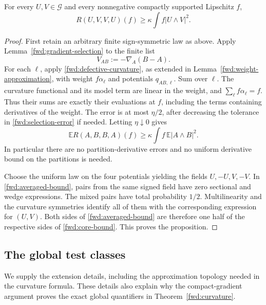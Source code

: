 \begin{proposition}
\label{fwd:gradient-bound}
For every \(U,V\in\mathcal G\) and every nonnegative compactly
supported Lipschitz \(f\),
\begin{equation}
\label{fwd:core-bound}
 R(U,V,V,U)(f)\geq\kappa\int f|U\wedge V|^2.
\end{equation}
\end{proposition}

\begin{proof}
First retain an arbitrary finite sign-symmetric law as above. Apply
Lemma~\ref{fwd:gradient-selection} to the finite list
\[
 V_{AB}:=-\nabla_A(B-A).
\]
For each \(\ell\), apply \eqref{fwd:defective-curvature}, as
extended in Lemma~\ref{fwd:weight-approximation}, with weight
\(f\alpha_\ell\) and potentials \(q_{AB,\ell}\). Sum over
\(\ell\). The curvature functional and its model term are linear
in the weight, and \(\sum_\ell f\alpha_\ell=f\). Thus their sums
are exactly their evaluations at \(f\), including the terms
containing derivatives of the weight. The error is at most
\(\eta/2\), after decreasing the tolerance in
\eqref{fwd:selection-error} if needed. Letting \(\eta\downarrow0\)
gives
\begin{equation}
\label{fwd:averaged-bound}
 \mathbb ER(A,B,B,A)(f)
 \geq\kappa\int f\,\mathbb E|A\wedge B|^2.
\end{equation}
In particular there are no partition-derivative errors and no
uniform derivative bound on the partitions is needed.

Choose the uniform law on the four potentials yielding the fields
\(U,-U,V,-V\). In \eqref{fwd:averaged-bound}, pairs from the same
signed field have zero sectional and wedge expressions. The mixed
pairs have total probability \(1/2\). Multilinearity and the
curvature symmetries identify all of them with the corresponding
expression for \((U,V)\). Both sides of
\eqref{fwd:averaged-bound} are therefore one half of the respective
sides of \eqref{fwd:core-bound}. This proves the proposition.
\end{proof}

\subsection{The global test classes}

We supply the extension details, including the approximation
topology needed in the curvature formula. These details also explain
why the compact-gradient argument proves the exact global
quantifiers in Theorem~\ref{fwd:curvature}.

